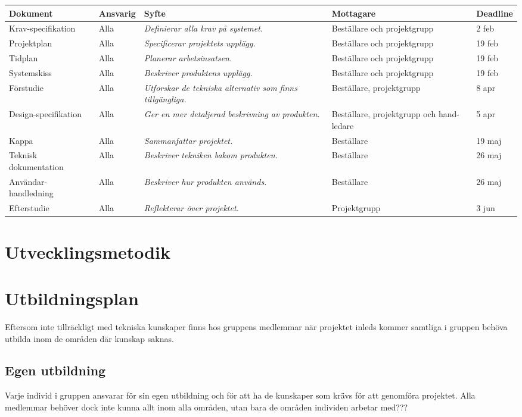 \documentclass[11pt]{article}
\begin{document}
\begin{flushleft}
\begin{longtable}{| p{.17\linewidth} | p{.11\linewidth} | p{.31\linewidth} | p{.15\linewidth} | p{.11\linewidth} |} \hline
\textbf{Dokument} & \textbf{Ansvarig} & \textbf{Syfte} & \textbf{Mottagare} & \textbf{Deadline} \\ \hline
Krav-specifikation & Alla & \textit{Definierar alla krav på systemet.} & Beställare och projektgrupp & 2 feb \\ \hline
Projektplan & Alla & \textit{Specificerar projektets upplägg.} & Beställare och projektgrupp & 19 feb \\ \hline
Tidplan & Alla & \textit{Planerar arbetsinsatsen.} & Beställare och projektgrupp & 19 feb \\ \hline
Systemskiss & Alla & \textit{Beskriver produktens upplägg.} & Beställare och projektgrupp & 19 feb \\ \hline
Förstudie & Alla & \textit{Utforskar de tekniska alternativ som finns tillgängliga.} & Beställare, projektgrupp & 8 apr \\ \hline
Design-specifikation & Alla & \textit{Ger en mer detaljerad beskrivning av produkten.} & Beställare, projektgrupp och hand-ledare & 5 apr \\ \hline
Kappa & Alla & \textit{Sammanfattar projektet.} & Beställare & 19 maj \\ \hline
Teknisk \mbox{dokumentation} & Alla & \textit{Beskriver tekniken bakom produkten.} & Beställare & 26 maj\\ \hline
Användar-handledning & Alla & \textit{Beskriver hur produkten används.} & Beställare & 26 maj \\ \hline
Efterstudie & Alla & \textit{Reflekterar över projektet.} & Projektgrupp & 3 jun \\ \hline

\end{longtable}

\pagebreak
\section{Utvecklingsmetodik}


\pagebreak
\section{Utbildningsplan}
Eftersom inte tillräckligt med tekniska kunskaper finns hos gruppens medlemmar när projektet inleds kommer samtliga i gruppen behöva utbilda inom de områden där kunskap saknas. 
\subsection{Egen utbildning}
Varje individ i gruppen ansvarar för sin egen utbildning och för att ha de kunskaper som krävs för att genomföra projektet. Alla medlemmar behöver dock inte kunna allt inom alla områden, utan bara de områden individen arbetar med???



\end{flushleft}
\end{document}
